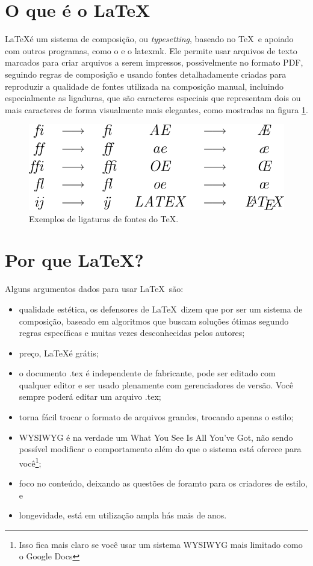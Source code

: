 \section{O que é o \LaTeX}

\LaTeX  é um sistema de composição, ou \textit{typesetting}, baseado no \TeX\   e apoiado com outros programas, como o  e o latexmk. Ele permite usar arquivos de texto marcados para criar arquivos a serem impressos, possivelmente no formato PDF,  seguindo regras de composição  e usando fontes detalhadamente criadas para reproduzir a qualidade de fontes utilizada na composição manual, incluindo especialmente as ligaduras, que são caracteres especiais que representam dois ou mais caracteres de forma visualmente mais elegantes, como mostradas na figura \ref{fig:ligatureslatex}.

\begin{figure}[hbt]
    \centering
    \includegraphics[width=0.7\linewidth]{Images/799px-LigaturesLatex}
    \caption[Exemplos de ligaturas de fontes do \TeX]{Exemplos de ligaturas de fontes do \TeX.}
    \label{fig:ligatureslatex}
\end{figure}

\section{Por que \LaTeX?}

Alguns argumentos dados para usar \LaTeX\  são:
\begin{itemize}
    \item qualidade estética, os defensores de \LaTeX\ dizem que por ser um sistema de composição, baseado em algoritmos que buscam soluções ótimas segundo regras específicas e muitas vezes desconhecidas pelos autores;
    \item preço, \LaTeX  é grátis;
    \item o documento .tex é independente de fabricante, pode ser editado com qualquer editor e ser usado plenamente com gerenciadores de versão. Você sempre poderá editar um arquivo .tex;
    \item torna fácil trocar o formato de arquivos grandes, trocando apenas o estilo;
    \item WYSIWYG é na verdade um What You See Is All You've Got, não sendo possível modificar o comportamento além do que o sistema está oferece para você\footnote{Isso fica mais claro se você usar um sistema WYSIWYG mais limitado como o Google Docs};
    \item foco no conteúdo, deixando as questões de foramto para os criadores de estilo, e
    \item longevidade, está em utilização ampla hás mais de anos.
\end{itemize}

